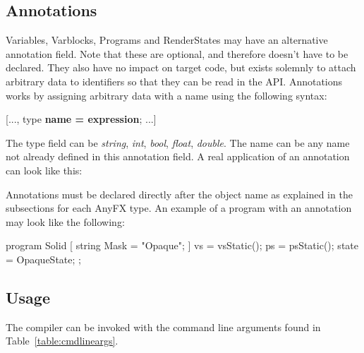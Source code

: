 \documentclass{article}
\newcommand{\SyntaxBox}[1]
{	
	\begin{center}
	\colorbox{orange!60}
	{
		\begin{minipage}{\linewidth}
		\hfill
		\begin{tabbing}
		#1
		\end{tabbing}
		\end{minipage}
	}
	\end{center}
}
\begin{document}
\subsection{Annotations}
Variables, Varblocks, Programs and RenderStates may have an alternative annotation field. Note that these are optional, and therefore doesn't have to be declared. They also have no impact on target code, but exists solemnly to attach arbitrary data to identifiers so that they can be read in the API. Annotations works by assigning arbitrary data with a name using the following syntax:

\SyntaxBox
{
	[..., type \textbf{name = expression}; ...]
}

The type field can be \textit{string}, \textit{int}, \textit{bool}, \textit{float}, \textit{double}. The name can be any name not already defined in this annotation field. A real application of an annotation can look like this:

\begin{CodeBox}
	[ string Mask = "Opaque"; ]
\end{CodeBox}

Annotations must be declared directly after the object name as explained in the subsections for each AnyFX type. An example of a program with an annotation may look like the following:

\begin{CodeBox}
program Solid [ string Mask = "Opaque"; ]
{
	vs = vsStatic();
	ps = psStatic();
	state = OpaqueState;
};
\end{CodeBox}

\subsection{Usage}
The compiler can be invoked with the command line arguments found in Table~\ref{table:cmdlineargs}.

\begin{table}[float]
\caption{Shader Dependencies}
\label{table:cmdlineargs}
\end{table}
\end{document}
